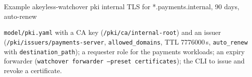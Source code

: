 \begin{session}{Example}
\you akeyless-watchover pki internal TLS for *.payments.internal, 90 days, auto-renew

\agent \texttt{model/pki.yaml} with a CA key (\texttt{/pki/ca/internal-root}) and an issuer
(\texttt{/pki/issuers/payments-server}, \texttt{allowed\_domains}, TTL 7776000\,s,
\texttt{auto\_renew} with \texttt{destination\_path}); a requester role for the payments workloads;
an expiry forwarder (\texttt{watchover forwarder --preset certificates}); the CLI to issue and
revoke a certificate.
\end{session}
